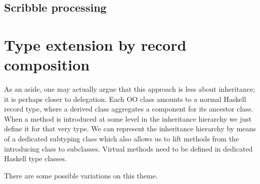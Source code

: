 \medskip

\subsection{Scribble processing}







\medskip

\section{Type extension by record composition}


As an aside, one may actually argue that this approach is less about
inheritance; it is perhaps closer to delegation. Each OO class
amounts to a normal Haskell record type, where a derived class
aggregates a component for its ancestor class. When a method is
introduced at some level in the inheritance hierarchy we just define
it for that very type. We can represent the inheritance hierarchy by
means of a dedicated subtyping class which also allows us to lift
methods from the introducing class to subclasses. Virtual methods need
to be defined in dedicated Haskell type classes.



There are some possible variations on this theme.



